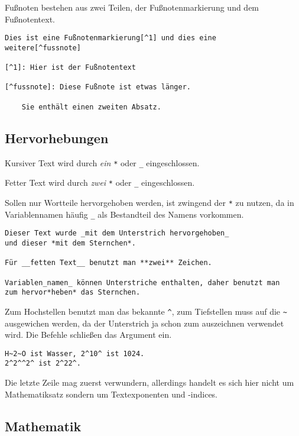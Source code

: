 \documentclass[11pt,ngerman,a4paper]{article}
\begin{document}
Fußnoten bestehen aus zwei Teilen, der Fußnotenmarkierung und dem
Fußnotentext.

\begin{verbatim}
Dies ist eine Fußnotenmarkierung[^1] und dies eine 
weitere[^fussnote]

[^1]: Hier ist der Fußnotentext

[^fussnote]: Diese Fußnote ist etwas länger.

    Sie enthält einen zweiten Absatz.
\end{verbatim}

\subsection{Hervorhebungen}

Kursiver Text wird durch \emph{ein} \texttt{*} oder \texttt{\_}
eingeschlossen.

Fetter Text wird durch \emph{zwei} \texttt{*} oder \texttt{\_}
eingeschlossen.

Sollen nur Wortteile hervorgehoben werden, ist zwingend der \texttt{*}
zu nutzen, da in Variablennamen häufig \texttt{\_} als Bestandteil des
Namens vorkommen.

\begin{verbatim}
Dieser Text wurde _mit dem Unterstrich hervorgehoben_
und dieser *mit dem Sternchen*.

Für __fetten Text__ benutzt man **zwei** Zeichen.

Variablen_namen_ können Unterstriche enthalten, daher benutzt man 
zum hervor*heben* das Sternchen.
\end{verbatim}

Zum Hochstellen benutzt man das bekannte \texttt{\^{}}, zum Tiefstellen
muss auf die \texttt{\textasciitilde{}} ausgewichen werden, da der
Unterstrich ja schon zum auszeichnen verwendet wird. Die Befehle
schließen das Argument ein.

\begin{verbatim}
H~2~O ist Wasser, 2^10^ ist 1024.
2^2^^2^ ist 2^22^.
\end{verbatim}

Die letzte Zeile mag zuerst verwundern, allerdings handelt es sich hier
nicht um Mathematiksatz sondern um Textexponenten und -indices.

\subsection{Mathematik}
\end{document}
